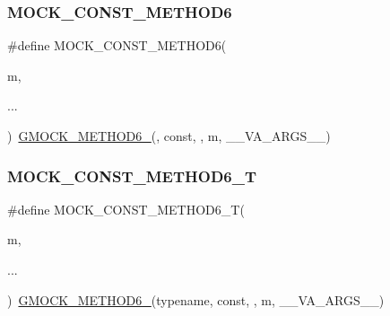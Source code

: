 \mbox{\label{_obj__test_2lib_2googletest-release-1_88_81_2googlemock_2include_2gmock_2gmock-generated-function-mockers_8h_a5081a185ba264d599357398952c23af1}} 
\subsubsection{\texorpdfstring{MOCK\_CONST\_METHOD6}{MOCK\_CONST\_METHOD6}}
{\footnotesize\ttfamily \#define M\+O\+C\+K\+\_\+\+C\+O\+N\+S\+T\+\_\+\+M\+E\+T\+H\+O\+D6(\begin{DoxyParamCaption}\item[{}]{m,  }\item[{}]{... }\end{DoxyParamCaption})~\mbox{\hyperlink{_obj__test_2lib_2googletest-release-1_88_81_2googlemock_2include_2gmock_2gmock-generated-function-mockers_8h_ad0ca7f6973a076d0af4c953f8ed91842}{G\+M\+O\+C\+K\+\_\+\+M\+E\+T\+H\+O\+D6\+\_\+}}(, const, , m, \+\_\+\+\_\+\+V\+A\+\_\+\+A\+R\+G\+S\+\_\+\+\_\+)}

\mbox{\label{_obj__test_2lib_2googletest-release-1_88_81_2googlemock_2include_2gmock_2gmock-generated-function-mockers_8h_a18f8d1d9ac6c6684bd681342e130662b}} 
\subsubsection{\texorpdfstring{MOCK\_CONST\_METHOD6\_T}{MOCK\_CONST\_METHOD6\_T}}
{\footnotesize\ttfamily \#define M\+O\+C\+K\+\_\+\+C\+O\+N\+S\+T\+\_\+\+M\+E\+T\+H\+O\+D6\+\_\+T(\begin{DoxyParamCaption}\item[{}]{m,  }\item[{}]{... }\end{DoxyParamCaption})~\mbox{\hyperlink{_obj__test_2lib_2googletest-release-1_88_81_2googlemock_2include_2gmock_2gmock-generated-function-mockers_8h_ad0ca7f6973a076d0af4c953f8ed91842}{G\+M\+O\+C\+K\+\_\+\+M\+E\+T\+H\+O\+D6\+\_\+}}(typename, const, , m, \+\_\+\+\_\+\+V\+A\+\_\+\+A\+R\+G\+S\+\_\+\+\_\+)}

